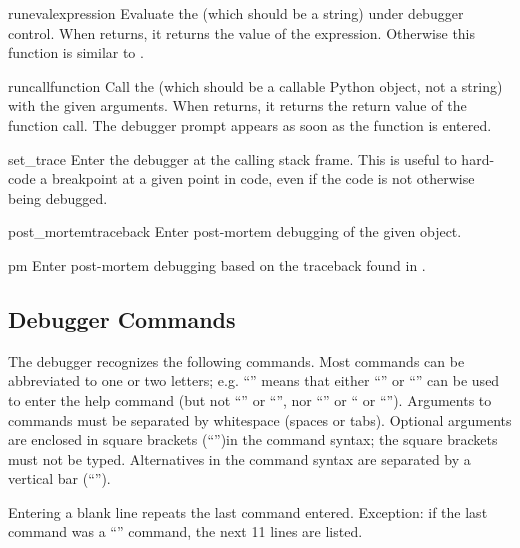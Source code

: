 \begin{funcdesc}{runeval}{expression}
Evaluate the  (which should be a string) under
debugger control.  When  returns, it returns the value
of the expression.  Otherwise this function is similar to
.
\end{funcdesc}

\begin{funcdesc}{runcall}{function}
Call the  (which should be a callable Python object, not
a string) with the given arguments.  When  returns, it
returns the return value of the function call.  The debugger prompt
appears as soon as the function is entered.
\end{funcdesc}

\begin{funcdesc}{set_trace}{}
Enter the debugger at the calling stack frame.  This is useful to
hard-code a breakpoint at a given point in code, even if the code is
not otherwise being debugged.
\end{funcdesc}

\begin{funcdesc}{post_mortem}{traceback}
Enter post-mortem debugging of the given  object.
\end{funcdesc}

\begin{funcdesc}{pm}{}
Enter post-mortem debugging based on the traceback found in
.
\end{funcdesc}

\subsection{Debugger Commands}

The debugger recognizes the following commands.  Most commands can be
abbreviated to one or two letters; e.g. ``'' means that
either ``'' or ``'' can be used to enter the help
command (but not ``'' or ``'', nor ``'' or
`` or ``'').  Arguments to commands must be
separated by whitespace (spaces or tabs).  Optional arguments are
enclosed in square brackets (``\code{[]}'')in the command syntax; the
square brackets must not be typed.  Alternatives in the command syntax
are separated by a vertical bar (``\code{|}'').

Entering a blank line repeats the last command entered.  Exception: if
the last command was a ``'' command, the next 11 lines are
listed.

